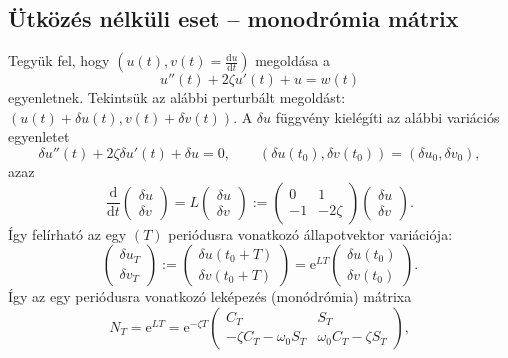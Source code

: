 \subsection{Ütközés nélküli eset -- monodrómia mátrix}
Tegyük fel, hogy $\left(u(t),v(t)=\frac{\mathrm{d}u}{\mathrm{d}t}\right)$ megoldása a 
\begin{equation}
u''(t)+2\zeta u'(t)+u=w(t)
\end{equation}
egyenletnek. Tekintsük az alábbi perturbált megoldást: $\left(u(t)+\delta u(t),v(t)+\delta v(t)\right)$. A $\delta u$ függvény kielégíti az alábbi variációs egyenletet
\begin{equation}
\delta u''(t)+2\zeta \delta u'(t)+\delta u=0,\qquad \left(\delta u(t_0),\delta v(t_0) \right)=\left(\delta u_0,\delta v_0 \right),
\end{equation}
azaz
\begin{equation}
\frac{\mathrm{d}}{\mathrm{d}t}\begin{pmatrix}
\delta u\\ \delta v
\end{pmatrix}=L\begin{pmatrix}
\delta u\\ \delta v
\end{pmatrix}:=\begin{pmatrix}
0 & 1 \\
-1 & -2\zeta
\end{pmatrix}\begin{pmatrix}
\delta u\\ \delta v
\end{pmatrix}.
\end{equation}
Így felírható az egy $(T)$ periódusra vonatkozó állapotvektor variációja:
\begin{equation}
\begin{pmatrix}
\delta u_T\\ \delta v_T
\end{pmatrix}:=
\begin{pmatrix}
\delta u(t_0+T)\\
\delta v(t_0+T)
\end{pmatrix}
=\mathrm{e}^{LT}\begin{pmatrix}
\delta u(t_0)\\ \delta v(t_0)
\end{pmatrix}.
\end{equation}
Így az egy periódusra vonatkozó leképezés (monódrómia) mátrixa
\begin{equation}\label{eq:Nt}
N_T=\mathrm{e}^{LT}=\mathrm{e}^{-\zeta T}\begin{pmatrix}
C_T & S_T\\
-\zeta C_T-\omega_0S_T & \omega_0C_T-\zeta S_T
\end{pmatrix},
\end{equation}

